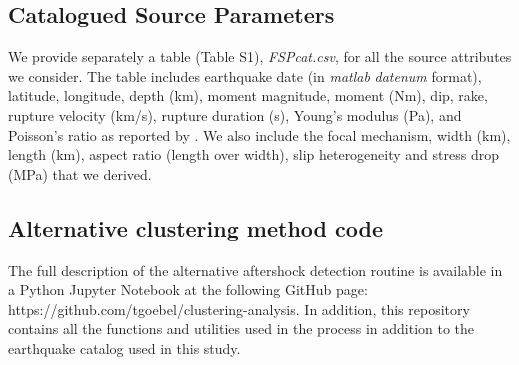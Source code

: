 \documentclass[draft]{agujournal}
\begin{document}
\subsection{Catalogued Source Parameters}\label{sec:source}

We provide separately a table (Table S1), \textit{FSPcat.csv}, for all the source attributes we consider. The table includes earthquake date (in \textit{matlab} \textit{datenum} format), latitude, longitude, depth (km), moment magnitude, moment (Nm), dip, rake, rupture velocity (km/s), rupture duration (s), Young's modulus (Pa), and Poisson's ratio as reported by \citet{Hayes2017}. We also include the focal mechanism, width (km), length (km), aspect ratio (length over width), slip heterogeneity and stress drop (MPa) that we derived.

\subsection{Alternative clustering method code}\label{sec:aftershock}
The full description of the alternative aftershock detection routine is  available in a Python Jupyter Notebook at the following GitHub page: https://github.com/tgoebel/clustering-analysis. In addition, this repository contains all the functions and utilities used in the process in addition to the earthquake catalog used in this study. 



\end{document}
